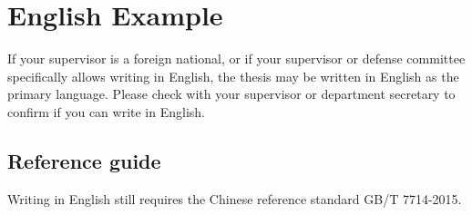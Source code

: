 
\chapter{English Example}

If your supervisor is a foreign national, or if your supervisor or defense committee specifically allows writing in English, the thesis may be written in English as the primary language. Please check with your supervisor or department secretary to confirm if you can write in English.

\section{Reference guide}

Writing in English still requires the Chinese reference standard GB/T 7714-2015.

